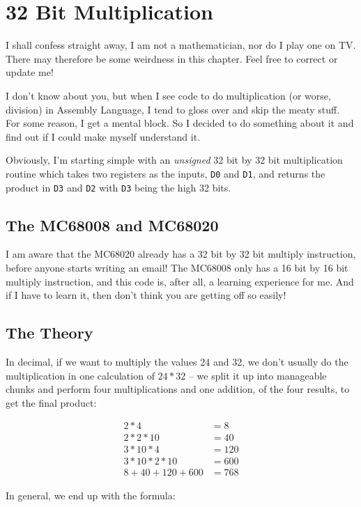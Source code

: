 
\chapter{32 Bit Multiplication}

I shall confess straight away, I am not a mathematician, nor do I
play one on TV. There may therefore be some weirdness in this chapter.
Feel free to correct or update me!

I don't know about you, but when I see code to do multiplication (or
worse, division) in Assembly Language, I tend to gloss over and skip
the meaty stuff. For some reason, I get a mental block. So I decided
to do something about it and find out if I could make myself understand
it.

Obviously, I'm starting simple with an \emph{unsigned} 32 bit by 32
bit multiplication routine which takes two registers as the inputs,
\texttt{D0} and \texttt{D1}, and returns the product in \texttt{D3}
and \texttt{D2} with \texttt{D3} being the high 32 bits.

\section{The MC68008 and MC68020}

I am aware that the MC68020 already has a 32 bit by 32 bit multiply
instruction, before anyone starts writing an email! The MC68008 only
has a 16 bit by 16 bit multiply instruction, and this code is, after
all, a learning experience for me. And if I have to learn it, then
don't think you are getting off so easily!

\section{The Theory}

In decimal, if we want to multiply the values 24 and 32, we don't
usually do the multiplication in one calculation of $24*32$ -- we
split it up into manageable chunks and perform four multiplications
and one addition, of the four results, to get the final product:

\begin{align*}
2*4 & =8\\
2*2*10 & =40\\
3*10*4 & =120\\
3*10*2*10 & =600\\
8+40+120+600 & =768
\end{align*}

In general, we end up with the formula:

